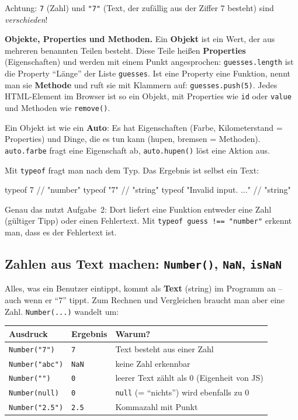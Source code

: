 \documentclass[a4paper,11pt]{article}
\begin{document}
Achtung: \lstinline|7| (Zahl) und \lstinline|"7"| (Text, der zufällig aus der Ziffer 7 besteht) sind \emph{verschieden}!

\textbf{Objekte, Properties und Methoden.} Ein \textbf{Objekt} ist ein Wert, der aus mehreren benannten Teilen
besteht. Diese Teile heißen \textbf{Properties} (Eigenschaften) und werden mit einem Punkt angesprochen:
\lstinline|guesses.length| ist die Property "`Länge"' der Liste \texttt{guesses}. Ist eine Property eine Funktion,
nennt man sie \textbf{Methode} und ruft sie mit Klammern auf: \lstinline|guesses.push(5)|. Jedes HTML-Element im
Browser ist so ein Objekt, mit Properties wie \lstinline|id| oder \lstinline|value| und Methoden wie
\lstinline|remove()|.

\begin{analogie}
Ein Objekt ist wie ein \textbf{Auto}: Es hat Eigenschaften (Farbe, Kilometerstand = Properties) und Dinge, die
es tun kann (hupen, bremsen = Methoden). \lstinline|auto.farbe| fragt eine Eigenschaft ab, \lstinline|auto.hupen()|
löst eine Aktion aus.
\end{analogie}

Mit \lstinline|typeof| fragt man nach dem Typ. Das Ergebnis ist selbst ein Text:
\begin{code}[numbers=none]
typeof 7          // "number"
typeof "7"        // "string"
typeof "Invalid input. ..."   // "string"
\end{code}
Genau das nutzt Aufgabe~2: Dort liefert eine Funktion entweder eine Zahl (gültiger Tipp) oder einen Fehlertext.
Mit \lstinline|typeof guess !== "number"| erkennt man, dass es der Fehlertext ist.

\subsection{Zahlen aus Text machen: \texttt{Number()}, \texttt{NaN}, \texttt{isNaN}}

Alles, was ein Benutzer eintippt, kommt als \textbf{Text} (string) im Programm an -- auch wenn er "`7"' tippt.
Zum Rechnen und Vergleichen braucht man aber eine Zahl. \lstinline|Number(...)| wandelt um:

\begin{center}
\begin{tabular}{@{}lll@{}}
\toprule
Ausdruck & Ergebnis & Warum?\\
\midrule
\lstinline|Number("7")|   & \lstinline|7|   & Text besteht aus einer Zahl\\
\lstinline|Number("abc")| & \lstinline|NaN| & keine Zahl erkennbar\\
\lstinline|Number("")|    & \lstinline|0|   & leerer Text zählt als 0 (Eigenheit von JS)\\
\lstinline|Number(null)|  & \lstinline|0|   & \texttt{null} (= "`nichts"') wird ebenfalls zu 0\\
\lstinline|Number("2.5")| & \lstinline|2.5| & Kommazahl mit Punkt\\
\bottomrule
\end{tabular}
\end{center}
\end{document}
